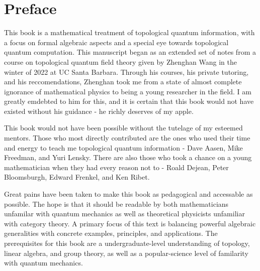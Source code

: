 \section{Preface}
\label{Preface}

This book is a mathematical treatment of topological quantum information, with a focus on formal algebraic aspects and a special eye towards topological quantum computation. This manuscript began as an extended set of notes from a course on topological quantum field theory given by Zhenghan Wang in the winter of 2022 at UC Santa Barbara. Through his courses, his private tutoring, and his reccomendations, Zhenghan took me from a state of almost complete ignorance of mathematical physics to being a young researcher in the field. I am greatly emdebted to him for this, and it is certain that this book would not have existed without his guidance - he richly deserves of my apple.

This book would not have been possible without the tutelage of my esteemed mentors. Those who most directly contributed are the ones who used their time and energy to teach me topological quantum information - Dave Aasen, Mike Freedman, and Yuri Lensky. There are also those who took a chance on a young mathematician when they had every reason not to - Roald Dejean, Peter Bloomsburgh, Edward Frenkel, and Ken Ribet.


Great pains have been taken to make this book as pedagogical and accessable as possible. The hope is that it should be readable by both mathematicians unfamilar with quantum mechanics as well as theoretical physicists unfamiliar with category theory. A primary focus of this text is balancing powerful algebraic generalities with concrete examples, principles, and applications. The prerequisites for this book are a undergraduate-level understanding of topology, linear algebra, and group theory, as well as a popular-science level of familarity with quantum mechanics.

